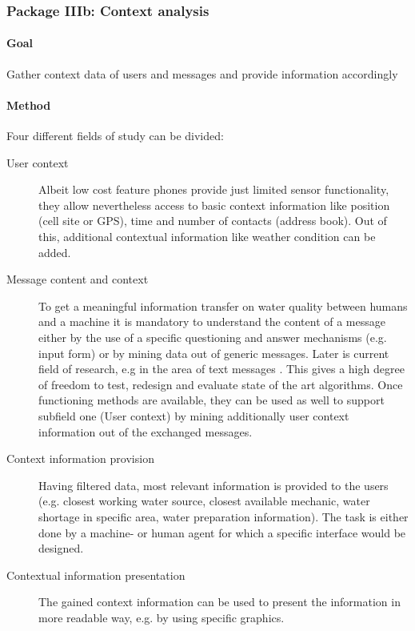 \documentclass[11pt]{article}
\begin{document}






\subsubsection*{Package IIIb: Context analysis}
\paragraph{Goal} Gather context data of users and messages and provide information accordingly

\paragraph{Method}
Four different fields of study can be divided:
\begin{description}
 \item [User context] Albeit low cost feature phones provide just limited sensor functionality, they allow nevertheless access to basic context information like position (cell site or GPS), time and number of contacts (address book). Out of this, additional contextual information like weather condition can be added.
 \item [Message content and context] To get a meaningful information transfer on water quality between humans and a machine it is mandatory to understand the content of a message either by the use of a specific questioning and answer mechanisms (e.g. input form) or by mining data out of generic messages. Later is current field of research, e.g in the area of text messages \cite{aggarwal2012mining}. This gives a high degree of freedom to test, redesign and evaluate state of the art algorithms. Once functioning methods are available, they can be used as well to support subfield one (User context) by mining additionally user context information out of the exchanged messages. 
 \item [Context information provision] Having filtered data, most relevant information is provided to the users (e.g. closest working water source, closest available mechanic, water shortage in specific area, water preparation information). The task is either done by a machine- or human agent for which a specific interface would be designed.
 \item [Contextual information presentation] The gained context information can be used to present the information in more readable way, e.g. by using specific graphics.
\end{description}
\end{document}
